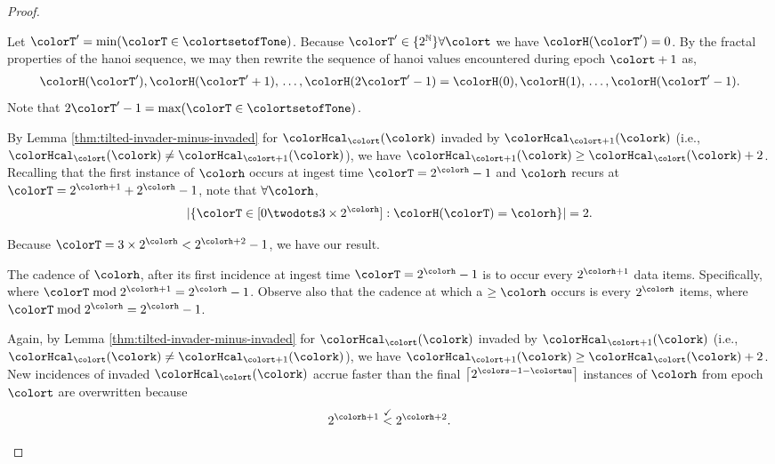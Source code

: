 \begin{proof}
\begin{proofpart}
Let $\colorT' = \min(\colorT \in \colortsetofTone)$.
Because $\colorT' \in \{2^{\mathbb{N}}\} \forall \colort$ we have $\colorH(\colorT') = 0$.
By the fractal properties of the hanoi sequence, we may then rewrite the sequence of hanoi values encountered during epoch $\colort + 1$ as,
\begin{align*}
\colorH(\colorT'), \colorH(\colorT'+1), \,\ldots, \colorH(2\colorT' - 1) = \colorH(0), \colorH(1), \,\ldots, \colorH(\colorT' - 1).
\end{align*}
Note that $2\colorT' - 1 = \max(\colorT \in \colortsetofTone)$.

By Lemma \ref{thm:tilted-invader-minus-invaded} for \hv{} $\colorHcal_{\colort}(\colork)$ invaded by \hv{} $\colorHcal_{\colort + 1}(\colork)$ (i.e., $\colorHcal_{\colort}(\colork) \neq \colorHcal_{\colort + 1}(\colork)$), we have $\colorHcal_{\colort + 1}(\colork) \geq \colorHcal_{\colort}(\colork) + 2$.
Recalling that the first instance of \hv{} $\colorh$ occurs at ingest time $\colorT = 2^{\colorh} - 1$ and \hv{} $\colorh$ recurs at $\colorT = 2^{\colorh + 1} + 2^{\colorh} - 1$, note that $\forall\colorh$,
\begin{align*}
|\{\colorT \in [0 \twodots 3 \times 2^{\colorh}] : \colorH(\colorT) = \colorh\}| = 2.
\end{align*}
\end{proofpart}
Because $\colorT = 3 \times 2^{\colorh} < 2^{\colorh + 2} - 1$, we have our result.

\begin{proofpart}
The cadence of \hv{} $\colorh$, after its first incidence at ingest time $\colorT=2^{\colorh} - 1$ is to occur every $2^{\colorh + 1}$ data items.
Specifically, where $\colorT \bmod 2^{\colorh + 1} = 2^{\colorh} - 1$.
Observe also that the cadence at which a \hv{} $\geq\colorh$ occurs is every $2^{\colorh}$ items, where $\colorT \bmod 2^{\colorh} = 2^{\colorh} - 1$.

Again, by Lemma \ref{thm:tilted-invader-minus-invaded} for \hv{} $\colorHcal_{\colort}(\colork)$ invaded by \hv{} $\colorHcal_{\colort + 1}(\colork)$ (i.e., $\colorHcal_{\colort}(\colork) \neq \colorHcal_{\colort + 1}(\colork)$), we have $\colorHcal_{\colort + 1}(\colork) \geq \colorHcal_{\colort}(\colork) + 2$.
New incidences of invaded \hv{} $\colorHcal_{\colort}(\colork)$ accrue faster than the final $\left\lceil 2^{\colors - 1 - \colortau} \right\rceil$ instances of \hv{} $\colorh$ from epoch $\colort$ are overwritten because
\begin{align*}
2^{\colorh + 1} \stackrel{\checkmark}{<} 2^{\colorh + 2}.
\end{align*}
\end{proofpart}

\end{proof}
